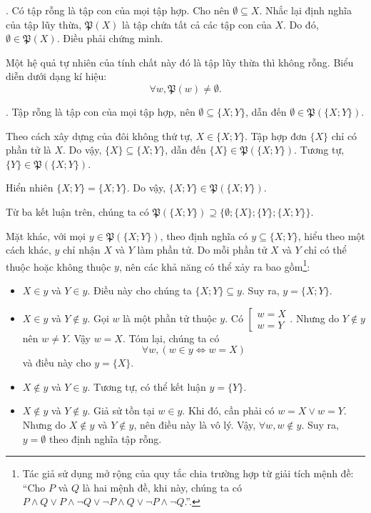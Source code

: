 \solution

\setcounter{subexercise}{1}
. Có tập rỗng là tập con của mọi tập hợp. Cho nên $\emptyset \subseteq X$. Nhắc lại định nghĩa của tập lũy thừa, $\mathfrak{P}(X)$ là tập chứa tất cả các tập con của $X$. Do đó, $\emptyset \in \mathfrak{P}(X)$. Điều phải chứng minh.

Một hệ quả tự nhiên của tính chất này đó là tập lũy thừa thì không rỗng. Biểu diễn dưới dạng kí hiệu:
$$
    \forall w, \mathfrak{P}(w) \neq \emptyset.
$$

. Tập rỗng là tập con của mọi tập hợp, nên $\emptyset \subseteq \{X; Y\}$, dẫn đến $\emptyset \in \mathfrak{P}(\{X; Y\})$.

Theo cách xây dựng của đôi không thứ tự, $X \in \{X; Y\}$. Tập hợp đơn $\{X\}$ chỉ có phần tử là $X$. Do vậy, $\{X\} \subseteq \{X; Y\}$, dẫn đến $\{X\} \in \mathfrak{P}(\{X; Y\})$. Tương tự, $\{Y\} \in \mathfrak{P}(\{X; Y\})$.

Hiển nhiên $\{X; Y\} = \{X; Y\}$. Do vậy, $\{X; Y\} \in \mathfrak{P}(\{X; Y\})$.

Từ ba kết luận trên, chúng ta có $\mathfrak{P}(\{X; Y\}) \supseteq \{\emptyset; \{X\}; \{Y\}; \{X; Y\}\}$.

Mặt khác, với mọi $y \in \mathfrak{P}(\{X; Y\})$, theo định nghĩa có $y \subseteq \{X; Y\}$, hiểu theo một cách khác, $y$ chỉ nhận $X$ và $Y$ làm phần tử. Do mỗi phần tử $X$ và $Y$ chỉ có thể thuộc hoặc không thuộc $y$, nên các khả năng có thể xảy ra bao gồm\footnote{Tác giả sử dụng mở rộng của quy tắc chia trường hợp từ giải tích mệnh đề: ``Cho $P$ và $Q$ là hai mệnh đề, khi này, chúng ta có $P \land Q \lor P \land \neg Q \lor \neg P \land Q \lor \neg P \land \neg Q$.''.}:

\begin{itemize}
    \item \textcolor{colorEmphasis}{$X \in y$ và $Y \in y$}. Điều này cho chúng ta $\{X; Y\} \subseteq y$. Suy ra, $y = \{X; Y\}$.
    \item \textcolor{colorEmphasisCyan}{$X \in y$ và $Y \notin y$}. Gọi $w$ là một phần tử thuộc $y$. Có $\left[\begin{array}{l} w = X \\ w = Y \end{array}\right.$. Nhưng do $Y \notin y$ nên $w \neq Y$. Vậy $w = X$. Tóm lại, chúng ta có
          $$\forall w, \left(w \in y \iff w = X\right)$$
          và điều này cho $y = \{X\}$.
    \item \textcolor{colorEmphasisGreen}{$X \notin y$ và $Y \in y$}. Tương tự, có thể kết luận $y = \{Y\}$.
    \item \textcolor{colorEmphasisPurple}{$X \notin y$ và $Y \notin y$}. Giả sử tồn tại $w \in y$. Khi đó, cần phải có $w = X \lor w = Y$. Nhưng do $X \notin y$ và $Y \notin y$, nên điều này là vô lý. Vậy, $\forall w, w \notin y$. Suy ra, $y = \emptyset$ theo định nghĩa tập rỗng.
\end{itemize}

